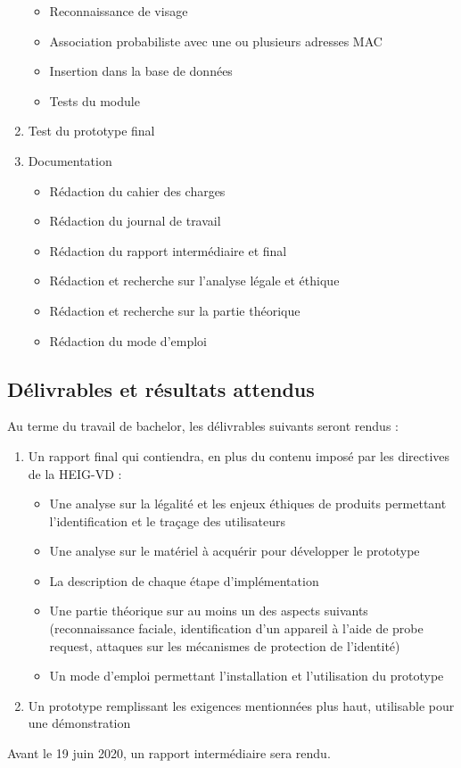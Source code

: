 \begin{enumerate}
\begin{itemize}
	\item Reconnaissance de visage
	\item Association probabiliste avec une ou plusieurs adresses MAC
	\item Insertion dans la base de données
	\item Tests du module
\end{itemize}
\item Test du prototype final
\item Documentation
\begin{itemize}
	\item Rédaction du cahier des charges
	\item Rédaction du journal de travail
	\item Rédaction du rapport intermédiaire et final
	\item Rédaction et recherche sur l’analyse légale et éthique
	\item Rédaction et recherche sur la partie théorique
	\item Rédaction du mode d’emploi
\end{itemize}
\end{enumerate}
\subsection*{Délivrables et résultats attendus}
Au terme du travail de bachelor, les délivrables suivants seront rendus :
\begin{enumerate}
\item Un rapport final qui contiendra, en plus du contenu imposé par les directives de la HEIG-VD :
	\begin{itemize}
	\item Une analyse sur la légalité et les enjeux éthiques de produits permettant l’identification et le
traçage des utilisateurs
	\item Une analyse sur le matériel à acquérir pour développer le prototype
	\item La description de chaque étape d’implémentation
	\item Une partie théorique sur au moins un des aspects suivants (reconnaissance faciale, identification
d’un appareil à l’aide de probe request, attaques sur les mécanismes de protection de l’identité)
	\item Un mode d’emploi permettant l’installation et l’utilisation du prototype
	\end{itemize}
\item Un prototype remplissant les exigences mentionnées plus haut, utilisable pour une démonstration
\end{enumerate}

Avant le 19 juin 2020, un rapport intermédiaire sera rendu.



